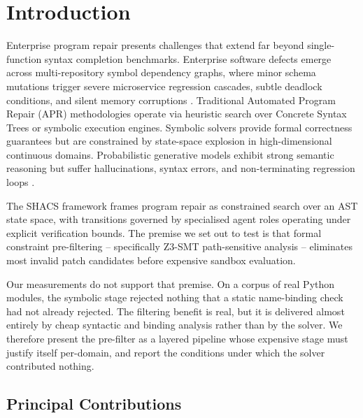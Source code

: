 \documentclass[10pt,journal,compsoc,twocolumn]{IEEEtran}
\begin{document}
\section{Introduction}


Enterprise program repair presents challenges that extend far beyond single-function syntax completion benchmarks. Enterprise software defects emerge across multi-repository symbol dependency graphs, where minor schema mutations trigger severe microservice regression cascades, subtle deadlock conditions, and silent memory corruptions \cite{arxiv_2405_01543,arxiv_2203_02155}. Traditional Automated Program Repair (APR) methodologies operate via heuristic search over Concrete Syntax Trees or symbolic execution engines. Symbolic solvers provide formal correctness guarantees but are constrained by state-space explosion in high-dimensional continuous domains. Probabilistic generative models exhibit strong semantic reasoning but suffer hallucinations, syntax errors, and non-terminating regression loops \cite{arxiv_2005_14165}.

The SHACS framework frames program repair as constrained search over an AST state space, with transitions governed by specialised agent roles operating under explicit verification bounds. The premise we set out to test is that formal constraint pre-filtering -- specifically Z3-SMT path-sensitive analysis -- eliminates most invalid patch candidates before expensive sandbox evaluation.

Our measurements do not support that premise. On a corpus of real Python modules, the symbolic stage rejected nothing that a static name-binding check had not already rejected. The filtering benefit is real, but it is delivered almost entirely by cheap syntactic and binding analysis rather than by the solver. We therefore present the pre-filter as a layered pipeline whose expensive stage must justify itself per-domain, and report the conditions under which the solver contributed nothing.


\subsection{Principal Contributions}
\end{document}
